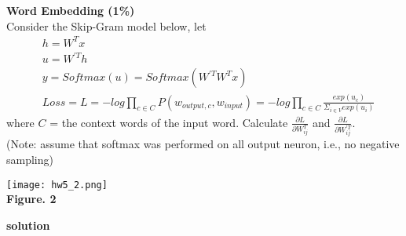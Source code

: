 \documentclass{article}
\begin{document}
\bigskip

\noindent
{\bf \Large Word Embedding (1\%)}\\

Consider the Skip-Gram model below, let
\begin{align*}
    &h = W^T x\\
    &u = W^{\prime T} h\\
    &y = Softmax(u) = Softmax(W^{\prime T} W^T x)\\
    &Loss = L = −log \prod_{c \in C} P(w_{output, c}, w_{input}) = −log \prod_{c \in C} \frac{exp(u_c)}{\Sigma_{i \in V} exp(u_i)}
\end{align*}
where $C$ = the context words of the input word. Calculate $\frac{\partial L}{\partial W^T_{ij}}$ and $\frac{\partial L}{\partial W^{\prime T}_{ij}}$.\\
(Note: assume that softmax was performed on all output neuron, i.e., no negative sampling)

\begin{center}
    \texttt{[image: hw5\_2.png]}\\
    {\bf Figure. 2}
\end{center}

\noindent
{\bf \large solution}\\
\end{document}
